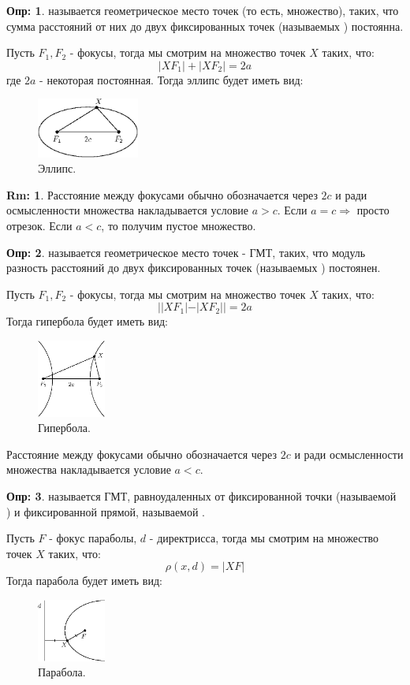 \documentclass[12pt]{article}
\theoremstyle{definition}
\newtheorem{defn}{Опр:}
\newtheorem{rem}{Rm:}
\begin{document}
\begin{defn}
	 называется геометрическое место точек (то есть, множество), таких, что сумма расстояний от них до двух фиксированных точек (называемых ) постоянна.
\end{defn}
Пусть $F_1, F_2$ - фокусы, тогда мы смотрим на множество точек $X$ таких, что:
$$
	|XF_1| + |XF_2| = 2a
$$
где $2a$ - некоторая постоянная. Тогда эллипс будет иметь вид:
\begin{figure}[H]
	\centering
	\includegraphics[width=0.3\textwidth]{ANGL1_2.eps}
	\caption{Эллипс.}
	\label{1_2}
\end{figure}
\begin{rem}
	Расстояние между фокусами обычно обозначается через $2c$ и ради осмысленности множества накладывается условие $a > c$. Если $a = c \Rightarrow$ просто отрезок. Если $a < c$, то получим пустое множество.
\end{rem}

\begin{defn}
	 называется геометрическое место точек - ГМТ, таких, что модуль разность расстояний до двух фиксированных точек (называемых ) постоянен.
\end{defn}
Пусть $F_1, F_2$ - фокусы, тогда мы смотрим на множество точек $X$ таких, что:  
$$
	||XF_1| - |XF_2|| = 2a
$$ 
Тогда гипербола будет иметь вид:
\begin{figure}[H]
	\centering
	\includegraphics[width=0.2\textwidth]{ANGL1_3.eps}
	\caption{Гипербола.}
	\label{1_3}
\end{figure}
Расстояние между фокусами обычно обозначается через $2c$ и ради осмысленности множества накладывается условие $a < c$.
\begin{defn}
	 называется ГМТ, равноудаленных от фиксированной точки (называемой ) и фиксированной прямой, называемой . 
\end{defn}
Пусть $F$ - фокус параболы, $d$ - директрисса, тогда мы смотрим на множество точек $X$ таких, что:
$$
	\rho(x,d) = |XF|
$$
Тогда парабола будет иметь вид:
\begin{figure}[H]
	\centering
	\includegraphics[width=0.2\textwidth]{ANGL1_4.eps}
	\caption{Парабола.}
	\label{1_4}
\end{figure}
\end{document}
